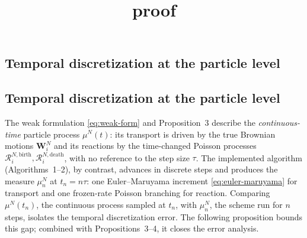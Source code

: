 \documentclass[12pt]{article}
\title{proof}
\begin{document}

\subsection*{Temporal discretization at the particle level}

\subsection*{Temporal discretization at the particle level}

The weak formulation \eqref{eq:weak-form} and Proposition~3 describe the
\emph{continuous-time} particle process $\mu^N(t)$: its transport is driven by
the true Brownian motions $\mathbf W^N_i$ and its reactions by the time-changed
Poisson processes $\mathcal R^{N,\mathrm{birth}}_i,\mathcal R^{N,\mathrm{death}}_i$,
with no reference to the step size $\tau$. The implemented algorithm
(Algorithms~1--2), by contrast, advances in discrete steps and produces the
measure $\mu^N_n$ at $t_n=n\tau$: one Euler--Maruyama increment
\eqref{eq:euler-maruyama} for transport and one frozen-rate Poisson branching
for reaction. Comparing $\mu^N(t_n)$, the continuous process sampled at $t_n$,
with $\mu^N_n$, the scheme run for $n$ steps, isolates the temporal
discretization error. The following proposition bounds this gap; combined with
Propositions~3--4, it closes the error analysis.
\end{document}
